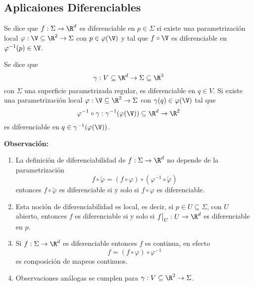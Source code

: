 \documentclass{article}
\begin{document}
\subsection{Aplicaiones Diferenciables}
\begin{dfn}
    Se dice que $f:\Sigma\to\R^{d}$ es diferenciable en $p\in\Sigma$ si existe una parametrización
    local $\varphi:\V\subseteq\R^{2}\to\Sigma$ con $p\in\varphi(\V)$ y tal que $f\circ\V$ es 
    diferenciable en $\varphi^{-1}(p)\in\V$.
\end{dfn}

\begin{dfn}
    Se dice que
    \begin{equation*}
        \gamma:V\subseteq\R^{d}\to\Sigma\subseteq\R^{3}
    \end{equation*}
    con $\Sigma$ una superficie parametrizada regular, es diferenciable en $q\in V$. Si existe una
    parametrización local $\varphi:\V\subseteq\R^{2}\to\Sigma$ con $\gamma(q)\in\varphi(\V)$ tal 
    que
    \begin{equation*}
        \varphi^{-1}\circ\gamma:\gamma^{-1}(\varphi(\V))\subseteq\R^{d}\to\R^{2}
    \end{equation*}
    es diferenciable en $q\in\gamma^{-1}(\varphi(\V))$.
\end{dfn}

\noindent\textbf{Observación:}
\begin{enumerate}
    \item La definición de diferenciabilidad de $f:\Sigma\to\R^{d}$ no depende de la 
    parametrización
    \begin{equation*}
        f\circ\widetilde{\varphi}=(f\circ\varphi)\circ(\varphi^{-1}\circ\widetilde{\varphi})
    \end{equation*}
    entonces $f\circ\widetilde{\varphi}$ es diferenciable si y solo si $f\circ\varphi$ es 
    diferenciable.

    \item Esta noción de diferenciabilidad es local, es decir, si $p\in U\subseteq\Sigma$, con
    $U$ abierto, entonces $f$ es diferenciable si y solo si $f\big|_{U}:U\to\R^{d}$ es 
    diferenciable en $p$.
    
    \item Si $f:\Sigma\to\R^{d}$ es diferenciable entonces $f$ es continua, en efecto
    \begin{equation*}
        f=(f\circ\varphi)\circ\varphi^{-1}
    \end{equation*}
    es composición de mapeos continuos.

    \item Observaciones análogas se cumplen para $\gamma:V\subseteq\R^{2}\to\Sigma$.
\end{enumerate}
\end{document}
